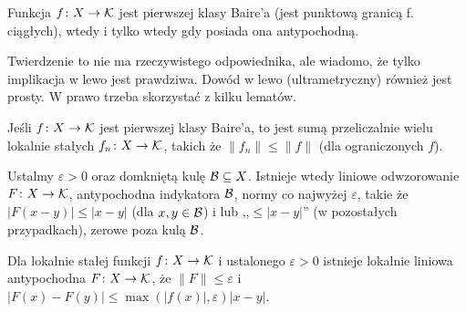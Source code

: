 \begin{fakt}
	Funkcja  $f \colon X \to \mathcal K$ jest pierwszej klasy Baire'a (jest punktową granicą f. ciągłych), wtedy i tylko wtedy gdy posiada ona antypochodną.
\end{fakt}

Twierdzenie to nie ma rzeczywistego odpowiednika, ale wiadomo, że tylko implikacja w lewo jest prawdziwa.
Dowód w lewo (ultrametryczny) również jest prosty.
W prawo trzeba skorzystać z kilku lematów.

\begin{lemat}
	Jeśli  $f \colon X \to \mathcal K$ jest pierwszej klasy Baire'a, to jest sumą przeliczalnie wielu lokalnie stałych $f_n \colon X \to \mathcal K$, takich że $\|f_n\| \le \|f\|$ (dla ograniczonych $f$).
\end{lemat}

\begin{lemat}
	Ustalmy  $\varepsilon > 0$ oraz domkniętą kulę $\mathcal B \subseteq X$.
	Istnieje wtedy liniowe odwzorowanie $F \colon X \to \mathcal K$, antypochodna indykatora $\mathcal B$, normy co najwyżej $\varepsilon$, takie że $|F(x-y)| \le |x- y|$ (dla $x, y \in \mathcal B$) i lub ,,$\le |x-y|$'' (w pozostałych przypadkach), zerowe poza kulą $\mathcal B$.
\end{lemat}

\begin{lemat}
	Dla  lokalnie stałej funkcji $f \colon X \to \mathcal K$ i ustalonego $\varepsilon > 0$ istnieje lokalnie liniowa antypochodna $F \colon X \to \mathcal K$, że $\|F\| \le \varepsilon$ i $|F(x) - F(y)| \le \max (|f(x)|, \varepsilon) |x-y|$.
\end{lemat}	
